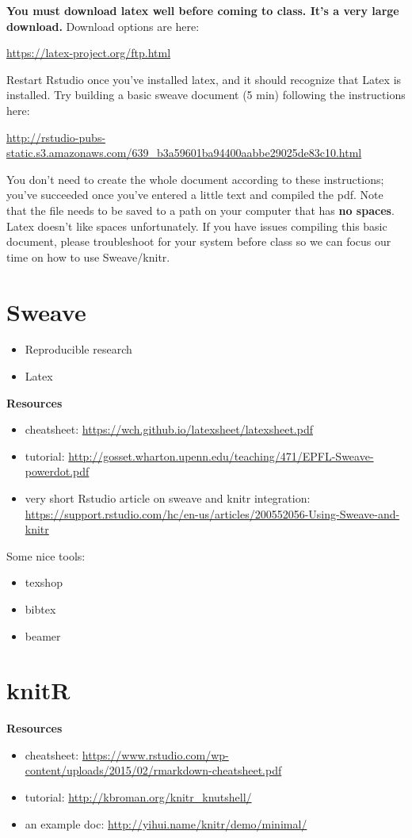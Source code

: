 \documentclass{article}
\begin{document}


\textbf{You must download latex well before coming to class. It's a very large download.} Download options are here: 

\url{https://latex-project.org/ftp.html}

Restart Rstudio once you've installed latex, and it should recognize that Latex is installed. Try building a basic sweave document (5 min) following the instructions here:

\url{http://rstudio-pubs-static.s3.amazonaws.com/639_b3a59601ba94400aabbe29025de83c10.html}

You don't need to create the whole document according to these instructions; you've succeeded once you've entered a little text and compiled the pdf. Note that the file needs to be saved to a path on your computer that has \textbf{no spaces}. Latex doesn't like spaces unfortunately. If you have issues compiling this basic document, please troubleshoot for your system before class so we can focus our time on how to use Sweave/knitr.

\section{Sweave}

\begin{itemize}
  \item Reproducible research
  \item Latex
\end{itemize}

\textbf{Resources}
\begin{itemize}
  \item cheatsheet: \url{https://wch.github.io/latexsheet/latexsheet.pdf}
  \item tutorial: \url{http://gosset.wharton.upenn.edu/teaching/471/EPFL-Sweave-powerdot.pdf}
  \item very short Rstudio article on sweave and knitr integration: \url{https://support.rstudio.com/hc/en-us/articles/200552056-Using-Sweave-and-knitr}
\end{itemize}

Some nice tools:

\begin{itemize}
  \item texshop
  \item bibtex
  \item beamer
\end{itemize}

\section{knitR}

\textbf{Resources}
\begin{itemize}
  \item cheatsheet: \url{https://www.rstudio.com/wp-content/uploads/2015/02/rmarkdown-cheatsheet.pdf}
  \item tutorial: \url{http://kbroman.org/knitr_knutshell/}
  \item an example doc: \url{http://yihui.name/knitr/demo/minimal/}
\end{itemize}
\end{document}
